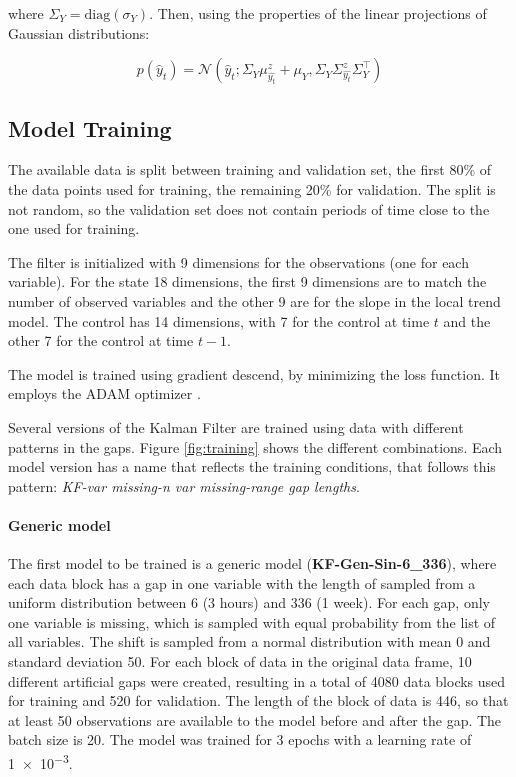 \documentclass{article}
\newcommand{\norm}[3]{\mathcal{N}\left(#1; #2, #3\right)} %
\let\Oldsubsection\subsection
\renewcommand{\subsection}{\FloatBarrier\Oldsubsection}
\begin{document}
where $\Sigma_Y = \text{diag}(\sigma_Y)$. Then, using the properties of the linear projections of Gaussian distributions:

\begin{equation*}
    p(\hat{y}_t) = \norm{\hat{y}_t}{\Sigma_Y\mu^z_{\hat{y_t}} + \mu_Y}{\Sigma_Y\Sigma^z_{\hat{y_t}}\Sigma_Y^\top}
\end{equation*}

\subsection{Model Training}

The available data is split between training and validation set, the first 80\% of the data points used for training, the remaining 20\% for validation. The split is not random, so the validation set does not contain periods of time close to the one used for training.

The filter is initialized with 9 dimensions for the observations (one for each variable). For the state 18 dimensions, the first 9 dimensions are to match the number of observed variables and the other 9 are for the slope in the local trend model. The control has 14 dimensions, with 7 for the control at time $t$ and the other 7 for the control at time $t-1$.

The model is trained using gradient descend, by minimizing the loss function. It employs the ADAM optimizer \cite{kingma_adam_2017}.

Several versions of the Kalman Filter are trained using data with different patterns in the gaps. Figure \ref{fig:training} shows the different combinations. Each model version has a name that reflects the training conditions, that follows this pattern: \textit{KF-\textlangle var missing\textrangle-\textlangle n var missing\textrangle-\textlangle range gap lengths}.

\paragraph{Generic model} The first model to be trained is a generic model (\textbf{KF-Gen-Sin-6\_336}), where each data block has a gap in one variable with the length of sampled from a uniform distribution between \num{6} (3 hours) and \num{336} (1 week). For each gap, only one variable is missing, which is sampled with equal probability from the list of all variables. The shift is sampled from a normal distribution with mean 0 and standard deviation 50. For each block of data in the original data frame, 10 different artificial gaps were created, resulting in a total of 4080 data blocks used for training and 520 for validation. 
The length of the block of data is \num{446}, so that at least \num{50} observations are available to the model before and after the gap. The batch size is \num{20}.
The model was trained for \num{3} epochs with a learning rate of \num{1e-3}.
\end{document}

